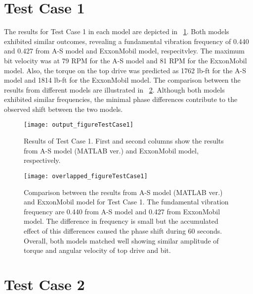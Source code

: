 \section{Test Case 1}
The results for Test Case 1 in each model are depicted in \figurename~\ref{figure_testcase1}. Both models exhibited similar outcomes, revealing a fundamental vibration frequency of 0.440 and 0.427 from A-S model and ExxonMobil model, respecitvley. The maximum bit velocity was at 79 RPM for the A-S model and 81 RPM for the ExxonMobil model. Also, the torque on the top drive was predicted as 1762 lb-ft for the A-S model and 1814 lb-ft for the ExxonMobil model. The comparison between the results from different models are illustrated in \figurename~\ref{figure_testcase1_overlapped}. Although both models exhibited similar frequencies, the minimal phase differences contribute to the observed shift between the two models.
\begin{figure}[!hbt]
  \centering
  \texttt{[image: output\_figureTestCase1]}
  \caption[Results of Test Case 1]{Results of Test Case 1. First and second columns show the results from A-S model (MATLAB ver.) and ExxonMobil model, respectively.}\label{figure_testcase1}
\end{figure}
\begin{figure}
  \centering
  \texttt{[image: overlapped\_figureTestCase1]}
  \caption[Comparison of the results for Test Case 1]{Comparison between the results from A-S model (MATLAB ver.) and ExxonMobil model for Test Case 1. The fundamental vibration frequency are 0.440 from A-S model and 0.427 from ExxonMobil model. The difference in frequency is small but the accumulated effect of this differences caused the phase shift during 60 seconds. Overall, both models matched well showing similar amplitude of torque and angular velocity of top drive and bit. }\label{figure_testcase1_overlapped}
\end{figure}

\section{Test Case 2}
